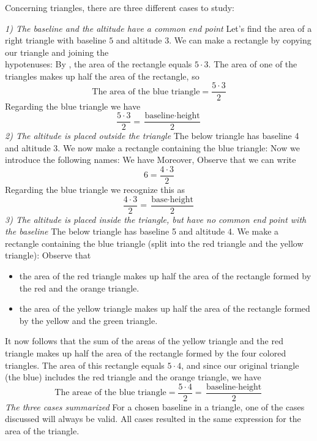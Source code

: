 \subsubsection{\artri \label{artri}}
Concerning triangles, there are three different cases to study: \vsk

\textit{1) The baseline and the altitude have a common end point} \os
Let's find the area of a right triangle with baseline $ 5 $ and altitude $ 3 $.
We can make a rectangle by copying our triangle and joining the \\hypotenuses:
By , the area of the rectangle equals $ {5\cdot 3} $. The area of one of the triangles makes up half the area of the rectangle, so
\[ \text{The area of the blue triangle} = \frac{5\cdot 3}{2} \]
Regarding the blue triangle we have
\[\frac{5\cdot3}{2}= \frac{\text{baseline}\cdot \text{height}}{2} \]
\newpage
\textit{2) The altitude is placed outside the triangle} \os
The below triangle has baseline 4 and altitude 3. 
We now make a rectangle containing the blue triangle:
Now we introduce the following names:
We have
Moreover,
Observe that we can write
\[ 6=\frac{4\cdot3}{2} \]
Regarding the blue triangle we recognize this as 
\[ \frac{4\cdot3}{2}=\frac{\text{base}\cdot\text{height}}{2} \]
\newpage
\textit{3) The altitude is placed inside the triangle, but have no common end point with the baseline} \os
The below triangle has baseline 5 and altitude 4.
We make a rectangle containing the blue triangle (split into the red triangle and the yellow triangle):
Observe that
\begin{itemize}
	\item the area of the red triangle makes up half the area of the rectangle formed by the red and the orange triangle.
	\item the area of the yellow triangle makes up half the area of the rectangle formed by the yellow and the green triangle.
\end{itemize}
It now follows that the sum of the areas of the yellow triangle and the red triangle makes up half the area of the rectangle formed by the four colored triangles. The area of this rectangle equals $ 5\cdot4 $, and since our original triangle (the blue) includes the red triangle and the orange triangle, we have
\[ \text{The areae of the blue triangle}=\frac{5\cdot4}{2}=\frac{\text{baseline}\cdot\text{height}}{2} \] 
\newpage
\textit{The three cases summarized}\os
For a chosen baseline in a triangle, one of the cases discussed will always be valid. All cases resulted in the same expression for the area of the triangle.\regv

